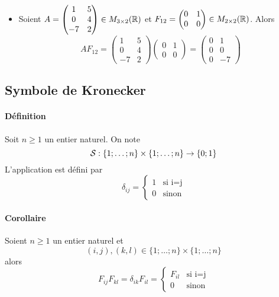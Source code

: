 \begin{itemize}
  \item Soient $A = \begin{pmatrix} 1 & 5 \\ 0 & 4 \\ -7 & 2 \end{pmatrix} \in  M_{3 \times 2}(\mathbb{R})$  et $F_{1 2} = \begin{pmatrix} 0 & 1 \\ 0 & 0 \end{pmatrix} \in M_{2 \times 2}(\mathbb{R})$. Alors
    $$A F_{1 2} 
      = \begin{pmatrix} 1 & 5 \\ 0 & 4 \\ -7 & 2 \end{pmatrix} \begin{pmatrix} 0 & 1 \\ 0 & 0 \end{pmatrix} 
      =\begin{pmatrix} 0 & 1 \\ 0 & 0 \\ 0 & -7 \end{pmatrix}$$
\end{itemize}

%
\subsection{Symbole de Kronecker}
%
\paragraph{Définition} Soit $n \geq 1$ un entier naturel. On note
$$\mathcal{S}: \{1; \ldots; n\}\times\{1; \ldots; n \} \rightarrow \{0; 1\}$$
L'application est défini par
$$\delta_{ij} = \left\{\begin{array}{lr} 1 & \text{si i=j} \\ 0 & \text{sinon} \end{array} \right.$$ 

\paragraph{Corollaire} Soient $n \geq 1$ un entier naturel et
$$(i, j), (k, l) \in \{1; \ldots; n\}\times\{1; \ldots; n\}$$
alors
$$F_{ij}F_{kl} = \delta_{ik} F_{il} = 
  \left\{\begin{array}{lr} F_{il} & \text{si i=j} \\ 0 & \text{sinon} \end{array} \right.$$

